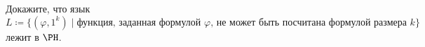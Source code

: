 Докажите, что язык
$$
    L \coloneqq \{(\varphi, 1^k) \mid
    \text{функция, заданная формулой $\varphi$, не может быть посчитана формулой размера $k$} \}
$$
лежит в $\PH$.